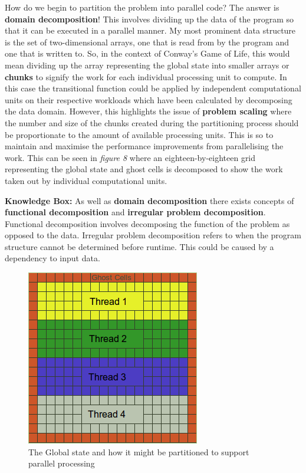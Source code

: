 \documentclass[11pt]{article} %
\begin{document}
How do we begin to partition the problem into parallel code? The answer is {\bf domain decomposition}! This involves dividing up the data of the program so that it can be executed in a parallel manner. My most prominent data structure is the set of two-dimensional arrays, one that is read from by the program and one that is written to. So, in the context of Conway's Game of Life, this would mean dividing up the array representing the global state into smaller arrays or {\bf chunks} to signify the work for each individual processing unit to compute. In this case the transitional function could be applied by independent computational units on their respective workloads which have been calculated by decomposing the data domain. However, this highlights the issue of {\bf problem scaling} where the number and size of the chunks created during the partitioning process should be proportionate to the amount of available processing units. This is so to maintain and maximise the performance improvements from parallelising the work. This can be seen in {\it figure 8} where an eighteen-by-eighteen grid representing the global state and ghost cells is decomposed to show the work taken out by individual computational units.
\bigskip
\begin{mdframed}
{\bf Knowledge Box:} As well as {\bf domain decomposition} there exists concepts of {\bf functional decomposition} and {\bf irregular problem decomposition}. Functional decomposition involves decomposing the function of the problem as opposed to the data. Irregular problem decomposition refers to when the program structure cannot be determined before runtime. This could be caused by a dependency to input data.\cite[p85]{ref9}
\end{mdframed}
\begin{figure}[h]
\centering
\includegraphics[scale=0.7]{DomainDecomposition.png}
\caption{The Global state and how it might be partitioned to support parallel processing}
\label{fig: Para1}
\end{figure}
\end{document}
